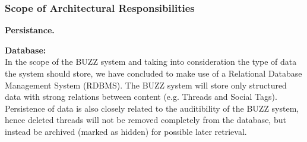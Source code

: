 
\subsubsection{Scope of Architectural Responsibilities}
\begin{flushleft}
	\textbf{Persistance.}
	\begin{flushleft}
	\textbf{Database: } \\
	In the scope of the BUZZ system and taking into consideration the type of data the system should store, we have concluded to make use of a Relational Database Management System (RDBMS). The BUZZ system will store only structured data with strong relations between content (e.g. Threads and Social Tags). Persistence of data is also closely related to the auditibility of the BUZZ system, hence deleted threads will not be removed completely from the database, but instead be archived (marked as hidden) for possible later retrieval.
	\end{flushleft}
\end{flushleft}